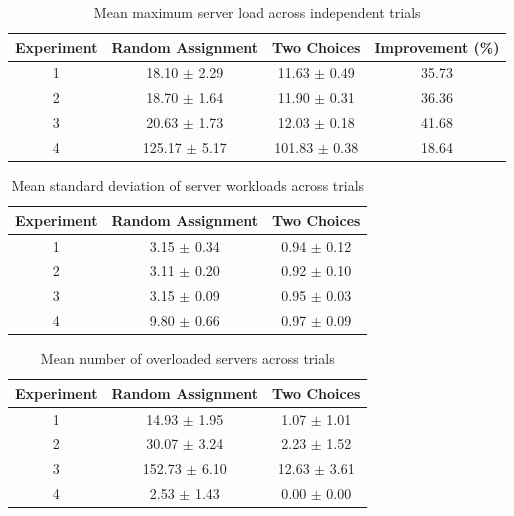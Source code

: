 
\begin{table}[H]
\centering
\caption{Mean maximum server load across independent trials}
\begin{tabular}{cccc}
\toprule
Experiment & Random Assignment & Two Choices & Improvement (\%) \\
\midrule
1 & 18.10 $\pm$ 2.29 & 11.63 $\pm$ 0.49 & 35.73 \\
2 & 18.70 $\pm$ 1.64 & 11.90 $\pm$ 0.31 & 36.36 \\
3 & 20.63 $\pm$ 1.73 & 12.03 $\pm$ 0.18 & 41.68 \\
4 & 125.17 $\pm$ 5.17 & 101.83 $\pm$ 0.38 & 18.64 \\
\bottomrule
\end{tabular}
\end{table}

\begin{table}[H]
\centering
\caption{Mean standard deviation of server workloads across trials}
\begin{tabular}{ccc}
\toprule
Experiment & Random Assignment & Two Choices \\
\midrule
1 & 3.15 $\pm$ 0.34 & 0.94 $\pm$ 0.12 \\
2 & 3.11 $\pm$ 0.20 & 0.92 $\pm$ 0.10 \\
3 & 3.15 $\pm$ 0.09 & 0.95 $\pm$ 0.03 \\
4 & 9.80 $\pm$ 0.66 & 0.97 $\pm$ 0.09 \\
\bottomrule
\end{tabular}
\end{table}

\begin{table}[H]
\centering
\caption{Mean number of overloaded servers across trials}
\begin{tabular}{ccc}
\toprule
Experiment & Random Assignment & Two Choices \\
\midrule
1 & 14.93 $\pm$ 1.95 & 1.07 $\pm$ 1.01 \\
2 & 30.07 $\pm$ 3.24 & 2.23 $\pm$ 1.52 \\
3 & 152.73 $\pm$ 6.10 & 12.63 $\pm$ 3.61 \\
4 & 2.53 $\pm$ 1.43 & 0.00 $\pm$ 0.00 \\
\bottomrule
\end{tabular}
\end{table}
